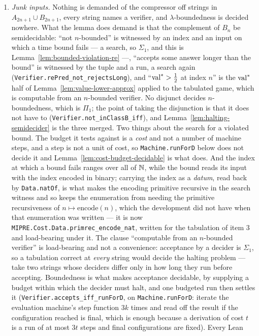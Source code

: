 \begin{remark}
\begin{enumerate}
\item \emph{Junk inputs.} Nothing is demanded of the compressor off strings in $A_{2n+1}
  \cup B_{2n+1}$, every string names a verifier, and $\lambda$-boundedness is decided
  nowhere. What the lemma does demand is that the complement of $B_n$ be semidecidable:
  ``not $n$-bounded'' is witnessed by an index and an input on which a time bound fails --- a
  search, so $\Sigma_1$, and this is Lemma~\ref{lem:bounded-violation-re} ---, ``accepts some
  answer longer than the bound'' is witnessed by the tuple and a run, a search again
  (\texttt{Verifier.rePred\_not\_rejectsLong}), and
  ``$\mathrm{val}^* > \frac12$ at index $n$'' is the $\mathrm{val}^*$ half of
  Lemma~\ref{lem:value-lower-approx} applied to the tabulated game, which is computable from
  an $n$-bounded verifier. No disjunct decides $n$-boundedness, which is $\Pi_1$; the point
  of taking the disjunction is that it does not have to
  (\texttt{Verifier.not\_inClassB\_iff}), and Lemma~\ref{lem:halting-semidecider} is the
  three merged. Two things about the search for a violated bound. The budget it tests against is a
  \emph{cost} and not a number of machine steps, and a step is not a unit of cost, so
  \texttt{Machine.runForD} below does not decide it and Lemma~\ref{lem:cost-budget-decidable}
  is what does. And the index at which a bound fails ranges over all of $\mathbb{N}$, while the bound
  reads its input with the index encoded in binary; carrying the index as a \emph{datum}, read
  back by \texttt{Data.natOf}, is what makes the encoding primitive recursive in the search
  witness and so keeps the enumeration from needing the primitive recursiveness of
  $n \mapsto \mathrm{encode}(n)$, which the development did not have when that enumeration was
  written --- it is now \texttt{MIPRE.Cost.Data.primrec\_encode\_nat}, written for the
  tabulation of item 3 and load-bearing under it. The clause ``computable from an $n$-bounded
  verifier'' is load-bearing and not a convenience: acceptance by a decider is $\Sigma_1$, so a
  tabulation correct at \emph{every} string would decide the halting problem --- take two
  strings whose deciders differ only in how long they run before accepting. Boundedness is what
  makes acceptance decidable, by supplying a budget within which the decider must halt, and one
  budgeted run then settles it (\texttt{Verifier.accepts\_iff\_runForD}, on
  \texttt{Machine.runForD}: iterate the evaluation machine's step function $3k$ times and read
  off the result if the configuration reached is final, which is enough because a derivation of
  cost $t$ is a run of at most $3t$ steps and final configurations are fixed). Every Lean

\end{enumerate}
\end{remark}
